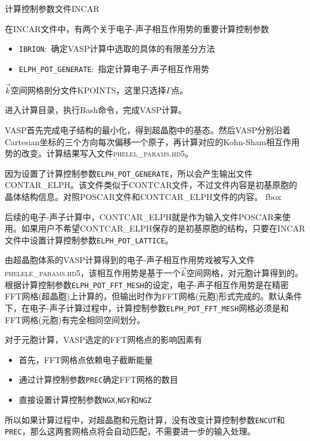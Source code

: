 计算控制参数文件\textrm{INCAR}

在\textrm{INCAR}文件中，有两个关于电子-声子相互作用势的重要计算控制参数
\begin{itemize}
	\item \texttt{IBRION}:~确定\textrm{VASP}计算中选取的具体的有限差分方法
	\item \texttt{ELPH\_POT\_GENERATE}:~指定计算电子-声子相互作用势
\end{itemize}

$\vec k$空间网格剖分文件\textrm{KPOINTS}，这里只选择$\Gamma$点。

进入计算目录，执行\textrm{Bash}命令，完成\textrm{VASP}计算。

\textrm{VASP}首先完成电子结构的最小化，得到超晶胞中的基态。然后\textrm{VASP}分别沿着\textrm{Cartesian}坐标的三个方向每次偏移一个原子，再计算对应的\textrm{Kohn-Sham}相互作用势的改变。计算结果写入文件\textsc{phelel\_params.hd5}。%

因为设置了计算控制参数\texttt{ELPH\_POT\_GENERATE}，所以会产生输出文件\textrm{CONTAR\_ELPH}。该文件类似于\textrm{CONTCAR}文件，不过文件内容是初基原胞的晶体结构信息。对照\textrm{POSCAR}文件和\textrm{CONTCAR\_ELPH}文件的内容。
fbox{}

后续的电子-声子计算中，\textrm{CONTCAR\_ELPH}就是作为输入文件\textrm{POSCAR}来使用。如果用户不希望\textrm{CONTCAR\_ELPH}保存的是初基原胞的结构，只要在\textrm{INCAR}文件中设置计算控制参数\texttt{ELPH\_POT\_LATTICE}。

由超晶胞体系的\textrm{VASP}计算得到的电子-声子相互作用势戏被写入文件\textsc{phelele\_params.hd5}，该相互作用势是基于一个$\vec k$空间网格，对元胞计算得到的。根据计算控制参数\texttt{ELPH\_POT\_FFT\_MESH}的设定，电子-声子相互作用势是在精密\textrm{FFT}网格(超晶胞)上计算的，但输出时作为\textrm{FFT}网格(元胞)形式完成的。默认条件下，在电子-声子计算过程中，计算控制参数\texttt{ELPH\_POT\_FFT\_MESH}网格必须是和\textrm{FFT}网格(元胞)有完全相同空间划分。

对于元胞计算，\textrm{VASP}选定的\textrm{FFT}网格点的影响因素有
\begin{itemize}
	\item 首先，\textrm{FFT}网格点依赖电子截断能量\textrmENCUT
	\item 通过计算控制参数\texttt{PREC}确定\textrm{FFT}网格的数目
	\item 直接设置计算控制参数\texttt{NGX},\texttt{NGY}和\texttt{NGZ}
\end{itemize}
所以如果计算过程中，对超晶胞和元胞计算，没有改变计算控制参数\texttt{ENCUT}和\texttt{PREC}，那么这两套网格点将会自动匹配，不需要进一步的输入处理。


